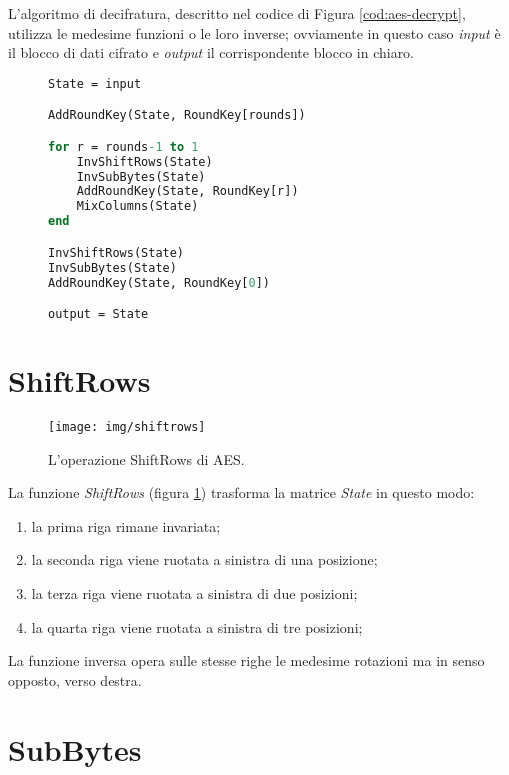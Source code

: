 \documentclass[12pt,a4paper,oneside]{book}
\begin{document}
L'algoritmo di decifratura, descritto nel codice di Figura \ref{cod:aes-decrypt}, utilizza le medesime funzioni o le loro inverse; ovviamente in questo caso \textit{input} è il blocco di dati cifrato e \textit{output} il corrispondente blocco in chiaro.

\vspace*{10pt}
\begin{figure}
\begin{lstlisting}[caption={\textit{Procedura di decifratura AES.}},label={cod:aes-decrypt},language=Pascal]
State = input

AddRoundKey(State, RoundKey[rounds])

for r = rounds-1 to 1
	InvShiftRows(State)
	InvSubBytes(State)
	AddRoundKey(State, RoundKey[r])
	MixColumns(State)
end

InvShiftRows(State)
InvSubBytes(State)
AddRoundKey(State, RoundKey[0])

output = State
\end{lstlisting}
\end{figure}

\section{ShiftRows}

\begin{figure}[h]
\begin{center}
\texttt{[image: img/shiftrows]}
\caption{L'operazione ShiftRows di AES.\label{fig:aes-shiftrows}}
\end{center}
\end{figure}

La funzione \textit{ShiftRows} (figura \ref{fig:aes-shiftrows}) trasforma la matrice \textit{State} in questo modo:
\begin{enumerate}
\item la prima riga rimane invariata;
\item la seconda riga viene ruotata a sinistra di una posizione;
\item la terza riga viene ruotata a sinistra di due posizioni;
\item la quarta riga viene ruotata a sinistra di tre posizioni;
\end{enumerate}

La funzione inversa opera sulle stesse righe le medesime rotazioni ma in senso opposto, verso destra.

\section{SubBytes}
\label{sec:aes-subbytes}
\end{document}
